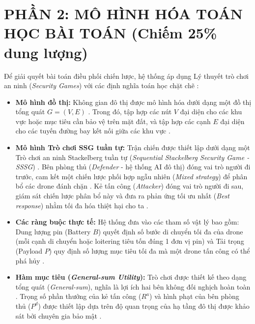 \documentclass[../main.tex]{subfiles}
\begin{document}

\section{PHẦN 2: MÔ HÌNH HÓA TOÁN HỌC BÀI TOÁN (Chiếm 25\% dung lượng)}

Để giải quyết bài toán điều phối chiến lược, hệ thống áp dụng Lý thuyết trò chơi an ninh (\textit{Security Games}) với các định nghĩa toán học chặt chẽ \cite{mutzari2025defending}:
\begin{itemize}
    \item \textbf{Mô hình đồ thị:} Không gian đô thị được mô hình hóa dưới dạng một đồ thị tổng quát $G=(V,E)$ \cite{mutzari2025defending}. Trong đó, tập hợp các nút $V$ đại diện cho các khu vực hoặc mục tiêu cần bảo vệ trên mặt đất, và tập hợp các cạnh $E$ đại diện cho các tuyến đường bay kết nối giữa các khu vực \cite{mutzari2025defending}.
    \item \textbf{Mô hình Trò chơi SSG tuần tự:} Trận chiến được thiết lập dưới dạng một Trò chơi an ninh Stackelberg tuần tự (\textit{Sequential Stackelberg Security Game - SSSG}) \cite{mutzari2025defending}. Bên phòng thủ (\textit{Defender} - hệ thống AI đô thị) đóng vai trò người đi trước, cam kết một chiến lược phối hợp ngẫu nhiên (\textit{Mixed strategy}) để phân bổ các drone đánh chặn \cite{mutzari2025defending}. Kẻ tấn công (\textit{Attacker}) đóng vai trò người đi sau, giám sát chiến lược phân bổ này và đưa ra phản ứng tối ưu nhất (\textit{Best response}) nhằm tối đa hóa thiệt hại cho ta \cite{mutzari2025defending}.
    \item \textbf{Các ràng buộc thực tế:} Hệ thống đưa vào các tham số vật lý bao gồm: Dung lượng pin (Battery $B$) quyết định số bước di chuyển tối đa của drone (mỗi cạnh di chuyển hoặc loitering tiêu tốn đúng 1 đơn vị pin) và Tải trọng (Payload $P$) quy định số lượng mục tiêu tối đa mà một drone tấn công có thể phá hủy \cite{mutzari2025defending}.
    \item \textbf{Hàm mục tiêu (\textit{General-sum Utility}):} Trò chơi được thiết kế theo dạng tổng quát (\textit{General-sum}), nghĩa là lợi ích hai bên không đối nghịch hoàn toàn \cite{mutzari2025defending}. Trọng số phần thưởng của kẻ tấn công ($R^a$) và hình phạt của bên phòng thủ ($P^d$) được thiết lập dựa trên độ quan trọng của hạ tầng đô thị được khảo sát bởi chuyên gia bảo mật \cite{mutzari2025defending}.
\end{itemize}
\end{document}
